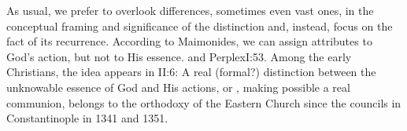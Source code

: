 
\pa As usual, we prefer to overlook differences, sometimes even vast ones, in
the conceptual framing and significance of the distinction and, instead, focus
on the fact of its recurrence.  According to Maimonides, we can assign
attributes to God's action, but not to His essence.   and \citet{these attributes too are
  not to be considered in reference to His essence, but in reference to the
  things that are created.}{Perplex}{I:53. Among the
  early Christians, the idea appears in \citeauthor*{Martyr}{ II:6}:   A real
  (formal?) distinction between the unknowable essence of God and His actions,
  or , making possible a real communion, belongs to the orthodoxy
  of the Eastern Church since the councils in Constantinople in 1341 and
  1351.}



